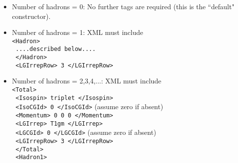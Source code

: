 \documentclass[12pt,notitlepage,letterpaper]{article}
\begin{document}
\begin{itemize}
\item                                               
Number of hadrons = 0:                                                              
  No further tags are required                                
     (this is the ``default" constructor).                     
\item                                        
Number of hadrons = 1: XML must include\\
\texttt{<Hadron>}\\                                              
\hspace*{15pt}\texttt{      ....described below.... }\\                                  
\texttt{   </Hadron>  }\\                                                  
\texttt{   <LGIrrepRow> 3 </LGIrrepRow> }                             
\item                                                                
Number of hadrons = 2,3,4,...:  XML must include\\                              
\texttt{<Total>}\\                                                      
\hspace*{15pt}\texttt{       <Isospin> triplet </Isospin> }\\                            
\hspace*{15pt}\texttt{       <IsoCGId> 0 </IsoCGId>} \hspace*{30pt}  (assume zero if absent) \\          
\hspace*{15pt}\texttt{       <Momentum>  0 0 0  </Momentum>}\\                           
\hspace*{15pt}\texttt{       <LGIrrep> T1gm </LGIrrep>}\\                                
\hspace*{15pt}\texttt{       <LGCGId> 0 </LGCGId>}  \hspace*{43pt}   (assume zero if absent)  \\           
\hspace*{15pt}\texttt{       <LGIrrepRow> 3 </LGIrrepRow>}\\                             
\texttt{   </Total> }\\                                                    
\texttt{   <Hadron1> }\\                                                   

\end{itemize}
\end{document}

